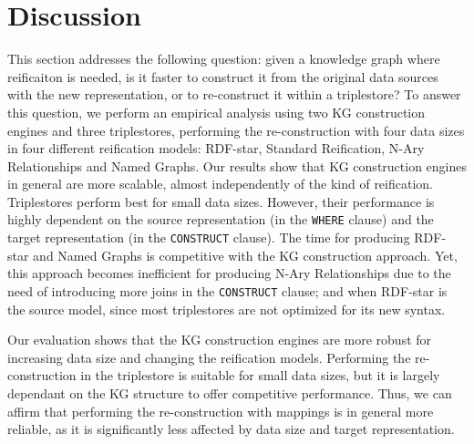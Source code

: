 



\section{Discussion}
\label{sec:chp6-1_discussion}

This section addresses the following question: given a knowledge graph where reificaiton is needed, is it faster to construct it from the original data sources with the new representation, or to re-construct it within a triplestore? To answer this question, we perform an empirical analysis using two KG construction engines and three triplestores, performing the re-construction with four data sizes in four different reification models: RDF-star, Standard Reification, N-Ary Relationships and Named Graphs. Our results show that KG construction engines in general are more scalable, almost independently of the kind of reification. Triplestores perform best for small data sizes. However, their performance is highly dependent on the source representation (in the \texttt{WHERE} clause) and the target representation (in the \texttt{CONSTRUCT} clause). The time for producing RDF-star and Named Graphs is competitive with the KG construction approach. Yet, this approach becomes inefficient for producing N-Ary Relationships due to the need of introducing more joins in the \texttt{CONSTRUCT} clause; and when RDF-star is the source model, since most triplestores are not optimized for its new syntax. 

Our evaluation shows that the KG construction engines are more robust for increasing data size and changing the reification models. Performing the re-construction in the triplestore is suitable for small data sizes, but it is largely dependant on the KG structure to offer competitive performance. Thus, we can affirm that performing the re-construction with mappings is in general more reliable, as it is significantly less affected by data size and target representation. 


